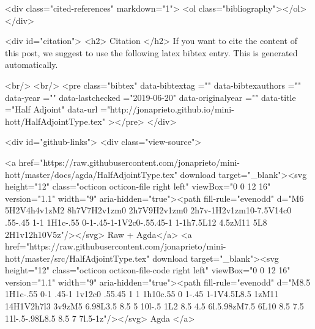   <div class="cited-references" markdown="1">
  <ol class="bibliography"></ol>
  </div>


  
  <div id="citation">
  <h2> Citation </h2>
  If you want to cite the content of this post,
  we suggest to use the following latex bibtex entry.
  This is generated automatically.

  <br/>
  <br/>
  <pre class="bibtex"
       data-bibtextag =""
       data-bibtexauthors =""
       data-year =""
       data-lastchecked ="2019-06-20"
       data-originalyear =""
       data-title ="Half Adjoint"
       data-url ="http://jonaprieto.github.io/mini-hott/HalfAdjointType.tex"
  ></pre>
  </div>
  

  <div id="github-links">
    <div class="view-source">
      
        <a href="https://raw.githubusercontent.com/jonaprieto/mini-hott/master/docs/agda/HalfAdjointType.tex" download target="_blank"><svg height="12" class="octicon octicon-file right left" viewBox="0 0 12 16" version="1.1" width="9" aria-hidden="true"><path fill-rule="evenodd" d="M6 5H2V4h4v1zM2 8h7V7H2v1zm0 2h7V9H2v1zm0 2h7v-1H2v1zm10-7.5V14c0 .55-.45 1-1 1H1c-.55 0-1-.45-1-1V2c0-.55.45-1 1-1h7.5L12 4.5zM11 5L8 2H1v12h10V5z"/></svg> Raw + Agda</a>
        <a href="https://raw.githubusercontent.com/jonaprieto/mini-hott/master/src/HalfAdjointType.tex" download target="_blank"><svg height="12" class="octicon octicon-file-code right left" viewBox="0 0 12 16" version="1.1" width="9" aria-hidden="true"><path fill-rule="evenodd" d="M8.5 1H1c-.55 0-1 .45-1 1v12c0 .55.45 1 1 1h10c.55 0 1-.45 1-1V4.5L8.5 1zM11 14H1V2h7l3 3v9zM5 6.98L3.5 8.5 5 10l-.5 1L2 8.5 4.5 6l.5.98zM7.5 6L10 8.5 7.5 11l-.5-.98L8.5 8.5 7 7l.5-1z"/></svg> Agda </a>
      

